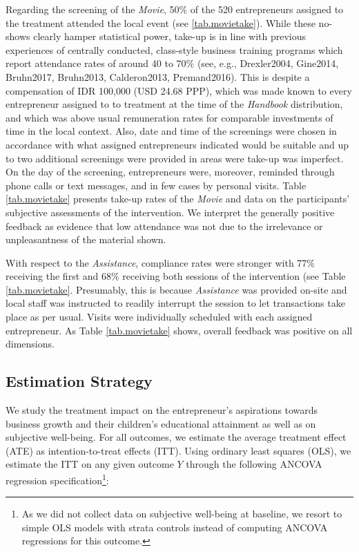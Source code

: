 \documentclass[11.5pt]{article}
\begin{document}
Regarding the screening of the \emph{Movie}, 50\% of the 520 entrepreneurs assigned to the treatment attended the local event (see \ref{tab.movietake}). While these no-shows clearly hamper statistical power, take-up is in line with previous experiences of centrally conducted, class-style business training programs which report attendance rates of around 40 to 70\% (see, e.g., Drexler2004, Gine2014, Bruhn2017, Bruhn2013, Calderon2013, Premand2016). This is despite a compensation of IDR 100,000 (USD 24.68 PPP), which was made known to every entrepreneur assigned to to treatment at the time of the \emph{Handbook} distribution, and which was above usual remuneration rates for comparable investments of time in the local context. Also, date and time of the screenings were chosen in accordance with what assigned entrepreneurs indicated would be suitable and up to two additional screenings were provided in areas were take-up was imperfect. On the day of the screening, entrepreneurs were, moreover, reminded through phone calls or text messages, and in few cases by personal visits. Table \ref{tab.movietake} presents take-up rates of the \emph{Movie} and data on the participants' subjective assessments of the intervention. We interpret the generally positive feedback as evidence that low attendance was not due to the irrelevance or unpleasantness of the material shown.

With respect to the \emph{Assistance}, compliance rates were stronger with 77\% receiving the first and 68\% receiving both sessions of the intervention (see Table \ref{tab.movietake}. Presumably, this is because \emph{Assistance} was provided on-site and local staff was instructed to readily interrupt the session to let transactions take place as per usual. Visits were individually scheduled with each assigned entrepreneur. As Table \ref{tab.movietake} shows, overall feedback was positive on all dimensions.

\subsection{Estimation Strategy}

We study the treatment impact on the entrepreneur's aspirations towards business growth and their children's educational attainment as well as on subjective well-being. For all outcomes, we estimate the average treatment effect (ATE) as intention-to-treat effects (ITT). Using ordinary least squares (OLS), we estimate the ITT on any given outcome $Y$ through the following ANCOVA regression specification\footnote{As we did not collect data on subjective well-being at baseline, we resort to simple OLS models with strata controls instead of computing ANCOVA regressions for this outcome.}:
\end{document}
